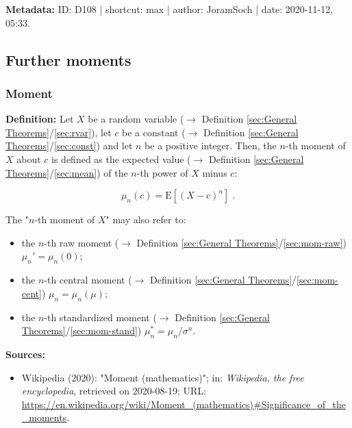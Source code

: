 \documentclass[a4paper,12pt,twoside]{book}
\begin{document}
\vspace{1em}
\textbf{Metadata:} ID: D108 | shortcut: max | author: JoramSoch | date: 2020-11-12, 05:33.
\vspace{1em}



\subsection{Further moments}

\subsubsection[\textit{Moment}]{Moment} \label{sec:mom}
\setcounter{equation}{0}

\textbf{Definition:} Let $X$ be a random variable ($\rightarrow$ Definition \ref{sec:General Theorems}/\ref{sec:rvar}), let $c$ be a constant ($\rightarrow$ Definition \ref{sec:General Theorems}/\ref{sec:const}) and let $n$ be a positive integer. Then, the $n$-th moment of $X$ about $c$ is defined as the expected value ($\rightarrow$ Definition \ref{sec:General Theorems}/\ref{sec:mean}) of the $n$-th power of $X$ minus $c$:

\begin{equation} \label{eq:mom-mom}
\mu_n(c) = \mathrm{E}[(X-c)^n] \; .
\end{equation}

The "$n$-th moment of $X$" may also refer to:

\begin{itemize}

\item the $n$-th raw moment ($\rightarrow$ Definition \ref{sec:General Theorems}/\ref{sec:mom-raw}) $\mu_n' = \mu_n(0)$;

\item the $n$-th central moment ($\rightarrow$ Definition \ref{sec:General Theorems}/\ref{sec:mom-cent}) $\mu_n = \mu_n(\mu)$;

\item the $n$-th standardized moment ($\rightarrow$ Definition \ref{sec:General Theorems}/\ref{sec:mom-stand}) $\mu_n^{*} = \mu_n/\sigma^n$.

\end{itemize}


\vspace{1em}
\textbf{Sources:}
\begin{itemize}
\item Wikipedia (2020): "Moment (mathematics)"; in: \textit{Wikipedia, the free encyclopedia}, retrieved on 2020-08-19; URL: \url{https://en.wikipedia.org/wiki/Moment_(mathematics)#Significance_of_the_moments}.
\end{itemize}
\end{document}
